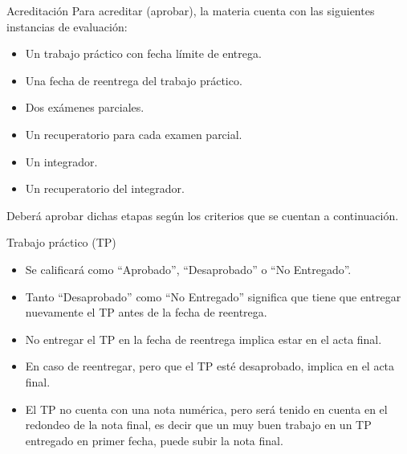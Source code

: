 
\begin{frame}{Acreditación}
  Para acreditar (aprobar), la materia cuenta con las siguientes instancias de
  evaluación:
  \begin{itemize}
    \item Un trabajo práctico  con fecha límite de entrega.
    \item Una fecha de reentrega del trabajo práctico.
    \item Dos exámenes parciales.
    \item Un recuperatorio para cada examen parcial.
    \item Un integrador.
    \item Un recuperatorio del integrador.
  \end{itemize}
  \jump
  Deberá aprobar dichas etapas según los criterios que se cuentan a continuación.
\end{frame}


\begin{frame}{Trabajo práctico (TP)}
  \begin{itemize}
    \item Se calificará como ``Aprobado'', ``Desaprobado'' o ``No Entregado''.
    \item Tanto ``Desaprobado'' como ``No Entregado'' significa que tiene que
      entregar nuevamente el TP antes de la fecha de reentrega.
    \item No entregar el TP en la fecha de reentrega implica estar 
      en el acta final.
    \item En caso de reentregar, pero que el TP esté desaprobado, implica
       en el acta final.
    \item El TP no cuenta con una nota numérica, pero será tenido en cuenta en
      el redondeo de la nota final, es decir que un muy buen trabajo en un TP
      entregado en primer fecha, puede subir la nota final.
  \end{itemize}
\end{frame}


